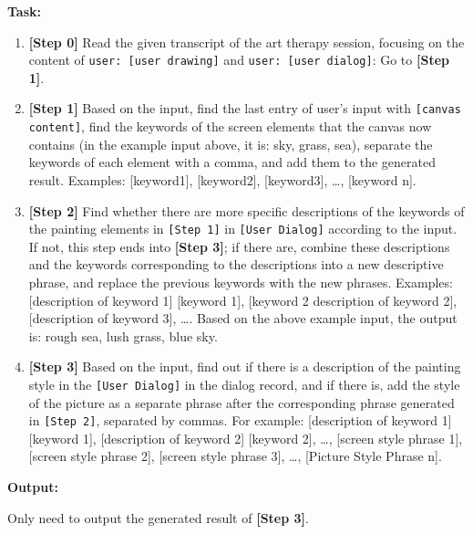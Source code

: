 \vspace{0.5em} %

\textbf{Task:}

\begin{enumerate}[label=\textbf{Step \arabic*:}]
    \item \textbf{[Step 0]} Read the given transcript of the art therapy session, focusing on the content of \texttt{user: [user drawing]} and \texttt{user: [user dialog]}: Go to \textbf{[Step 1]}.
    \item \textbf{[Step 1]} Based on the input, find the last entry of user's input with \texttt{[canvas content]}, find the keywords of the screen elements that the canvas now contains (in the example input above, it is: sky, grass, sea), separate the keywords of each element with a comma, and add them to the generated result. Examples: [keyword1], [keyword2], [keyword3], \dots, [keyword n].
    \item \textbf{[Step 2]} Find whether there are more specific descriptions of the keywords of the painting elements in \texttt{[Step 1]} in \texttt{[User Dialog]} according to the input. If not, this step ends into \textbf{[Step 3]}; if there are, combine these descriptions and the keywords corresponding to the descriptions into a new descriptive phrase, and replace the previous keywords with the new phrases. Examples: [description of keyword 1] [keyword 1], [keyword 2 description of keyword 2], [description of keyword 3], \dots. Based on the above example input, the output is: rough sea, lush grass, blue sky.
    \item \textbf{[Step 3]} Based on the input, find out if there is a description of the painting style in the \texttt{[User Dialog]} in the dialog record, and if there is, add the style of the picture as a separate phrase after the corresponding phrase generated in \texttt{[Step 2]}, separated by commas. For example: [description of keyword 1] [keyword 1], [description of keyword 2] [keyword 2], \dots, [screen style phrase 1], [screen style phrase 2], [screen style phrase 3], \dots, [Picture Style Phrase n].
\end{enumerate}

\vspace{0.5em} %

\textbf{Output:} 

Only need to output the generated result of \textbf{[Step 3]}.

\vspace{0.5em} %

